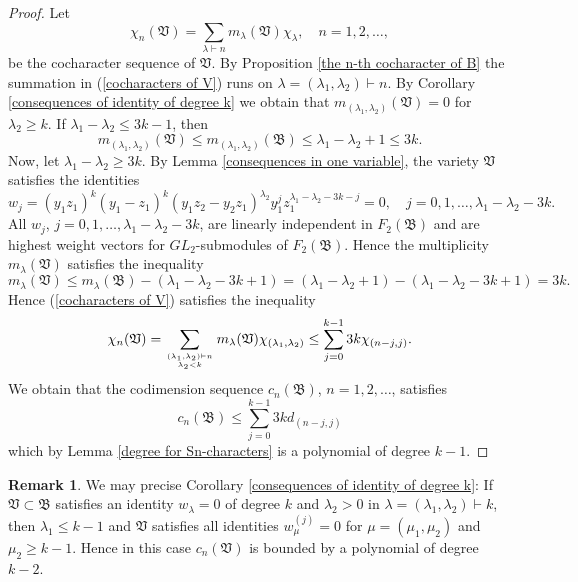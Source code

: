 \documentclass{amsart}[12pt]
\theoremstyle{definition}
\newtheorem{remark}[theorem]{Remark}
\begin{document}
\begin{proof}
Let
\begin{equation}\label{cocharacters of V}
\chi_n({\mathfrak V})=\sum_{\lambda\vdash n}m_{\lambda}({\mathfrak V})\chi_{\lambda},\quad n=1,2,\ldots,
\end{equation}
be the cocharacter sequence of $\mathfrak V$. By Proposition \ref{the n-th cocharacter of B} the summation in (\ref{cocharacters of V}) runs on
$\lambda=(\lambda_1,\lambda_2)\vdash n$. By Corollary \ref{consequences of identity of degree k} we obtain that
$m_{(\lambda_1,\lambda_2)}({\mathfrak V})=0$ for $\lambda_2\geq k$. If $\lambda_1-\lambda_2\leq 3k-1$, then
\[
m_{(\lambda_1,\lambda_2)}({\mathfrak V})\leq m_{(\lambda_1,\lambda_2)}({\mathfrak B}) \leq \lambda_1-\lambda_2+1\leq 3k.
\]
Now, let $\lambda_1-\lambda_2\geq 3k$. By Lemma \ref{consequences in one variable}, the variety $\mathfrak V$ satisfies the identities
\[
w_j=(y_1z_1)^k(y_1-z_1)^k(y_1z_2-y_2z_1)^{\lambda_2}y_1^jz_1^{\lambda_1-\lambda_2-3k-j}=0,\quad
j=0,1,\ldots,\lambda_1-\lambda_2-3k.
\]
All $w_j$, $j=0,1,\ldots,\lambda_1-\lambda_2-3k$, are linearly independent in $F_2({\mathfrak B})$
and are highest weight vectors for $GL_2$-submodules of $F_2({\mathfrak B})$.
Hence the multiplicity $m_{\lambda}({\mathfrak V})$ satisfies the inequality
\[
m_{\lambda}({\mathfrak V})\leq m_{\lambda}({\mathfrak B})-(\lambda_1-\lambda_2-3k+1)=(\lambda_1-\lambda_2+1)-(\lambda_1-\lambda_2-3k+1)=3k.
\]
Hence (\ref{cocharacters of V}) satisfies the inequality
\[
\chi_n({\mathfrak V})=\sum_{(\lambda_1,\lambda_2)\vdash n\atop \lambda_2<k}m_{\lambda}({\mathfrak V})\chi_{(\lambda_1,\lambda_2)}
\leq \sum_{j=0}^{k-1}3k\chi_{(n-j,j)}.
\]
We obtain that the codimension sequence $c_n({\mathfrak B})$, $n=1,2,\ldots$, satisfies
\[
c_n({\mathfrak B})\leq\sum_{j=0}^{k-1}3kd_{(n-j,j)}
\]
which by Lemma \ref{degree for Sn-characters} is a polynomial of degree $k-1$.
\end{proof}

\begin{remark}\label{better bound}
We may precise Corollary \ref{consequences of identity of degree k}: If ${\mathfrak V}\subset{\mathfrak B}$
satisfies an identity $w_{\lambda}=0$ of degree $k$ and $\lambda_2>0$ in $\lambda=(\lambda_1,\lambda_2)\vdash k$,
then $\lambda_1\leq k-1$ and $\mathfrak V$
satisfies all identities $w_{\mu}^{(j)}=0$ for $\mu=(\mu_1,\mu_2)$ and $\mu_2\geq k-1$. Hence in this case $c_n({\mathfrak V})$
is bounded by a polynomial of degree $k-2$.
\end{remark}
\end{document}
